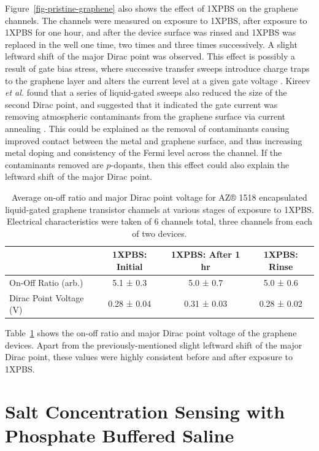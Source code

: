 \documentclass[
  a4paper,
]{scrbook}
\begin{document}
Figure~\ref{fig-pristine-graphene} also shows the effect of 1XPBS on the
graphene channels. The channels were measured on exposure to 1XPBS,
after exposure to 1XPBS for one hour, and after the device surface was
rinsed and 1XPBS was replaced in the well one time, two times and three
times successively. A slight leftward shift of the major Dirac point was
observed. This effect is possibly a result of gate bias stress, where
successive transfer sweeps introduce charge traps to the graphene layer
and alters the current level at a given gate voltage
\autocite{Bargaoui2018,Noyce2019}. Kireev \emph{et al.} found that a
series of liquid-gated sweeps also reduced the size of the second Dirac
point, and suggested that it indicated the gate current was removing
atmospheric contaminants from the graphene surface via current annealing
\autocite{Kireev2017}. This could be explained as the removal of
contaminants causing improved contact between the metal and graphene
surface, and thus increasing metal doping and consistency of the Fermi
level across the channel. If the contaminants removed are \(p\)-dopants,
then this effect could also explain the leftward shift of the major
Dirac point.

\hypertarget{tbl-graphene-parameters}{}
\begin{table}
\caption{\label{tbl-graphene-parameters}Average on-off ratio and major Dirac point voltage for AZ® 1518
encapsulated liquid-gated graphene transistor channels at various stages
of exposure to 1XPBS. Electrical characteristics were taken of 6
channels total, three channels from each of two devices. }\tabularnewline

\centering
\begin{tabular}{lccc}
\toprule
 & 1XPBS: Initial & 1XPBS: After 1 hr & 1XPBS: Rinse\\
\midrule
On-Off Ratio (arb.) & 5.1 ± 0.3 & 5.0 ± 0.7 & 5.0 ± 0.6\\
Dirac Point Voltage (V) & 0.28 ± 0.04 & 0.31 ± 0.03 & 0.28 ± 0.02\\
\bottomrule
\end{tabular}
\end{table}

Table~\ref{tbl-graphene-parameters} shows the on-off ratio and major
Dirac point voltage of the graphene devices. Apart from the
previously-mentioned slight leftward shift of the major Dirac point,
these values were highly consistent before and after exposure to 1XPBS.

\hypertarget{sec-dummy-sensing}{%
\section{Salt Concentration Sensing with Phosphate Buffered
Saline}\label{sec-dummy-sensing}}
\end{document}
